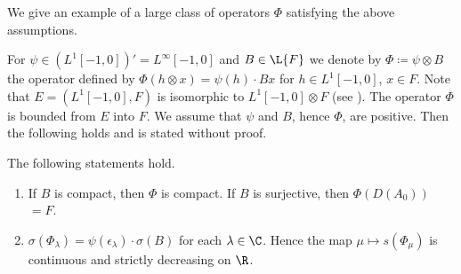 \begin{example}\label{ex:c4-3.9}
%
We give an example of a large class of operators $\Phi$ satisfying the above assumptions.

For $\psi \in (L^{1}[-1,0])' = L^{\infty}[-1,0]$ and $B \in \L{F}$ we denote by $\Phi \coloneqq \psi \otimes B$ the operator defined by $\Phi(h \otimes x) = \psi(h) \cdot Bx$ for $h \in L^{1}[-1,0]$, $x \in F$.
Note that $E = (L^{1}[-1,0],F)$ is isomorphic to $L^{1}[-1,0] \otimes F$ (see \textcite[Chapter III,6.5]{schaefer:1966}).
The operator $\Phi$ is bounded from $E$ into $F$.
We assume that $\psi$ and $B$, hence $\Phi$, are positive.
Then the following holds and is stated without proof.

\begin{lemma*}\label{lem:c4-3.9-kgk}
%
The following statements hold.
\begin{enumerate}[\upshape (i), wide,labelindent=.25em] 
\item \label{lem:c4-3.9-kgk.1}
If\/ $B$ is compact, then $\Phi$ is compact. 
If\/ $B$ is surjective, then $\Phi(D(A_{0}))$ $= F$.

\item \label{lem:c4-3.9-kgk.2}
$\sigma(\Phi_{\lambda}) = \psi(\epsilon_{\lambda}) \cdot \sigma(B)$ for each $\lambda \in \C$. 
Hence the map $\mu \mapsto s(\Phi_{\mu})$ is continuous and strictly decreasing on $\R$.
\end{enumerate}
\end{lemma*}
\end{example}


